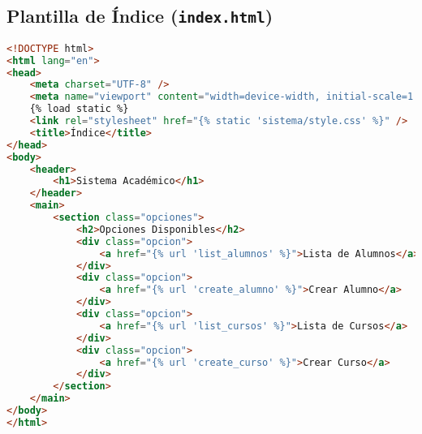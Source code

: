 \subsection{Plantilla de Índice (\texttt{index.html})}

\begin{lstlisting}[language=HTML, caption=Plantilla de Índice]
<!DOCTYPE html>
<html lang="en">
<head>
    <meta charset="UTF-8" />
    <meta name="viewport" content="width=device-width, initial-scale=1.0" />
    {% load static %}
    <link rel="stylesheet" href="{% static 'sistema/style.css' %}" />
    <title>Índice</title>
</head>
<body>
    <header>
        <h1>Sistema Académico</h1>
    </header>
    <main>
        <section class="opciones">
            <h2>Opciones Disponibles</h2>
            <div class="opcion">
                <a href="{% url 'list_alumnos' %}">Lista de Alumnos</a>
            </div>
            <div class="opcion">
                <a href="{% url 'create_alumno' %}">Crear Alumno</a>
            </div>
            <div class="opcion">
                <a href="{% url 'list_cursos' %}">Lista de Cursos</a>
            </div>
            <div class="opcion">
                <a href="{% url 'create_curso' %}">Crear Curso</a>
            </div>
        </section>
    </main>
</body>
</html>
\end{lstlisting}